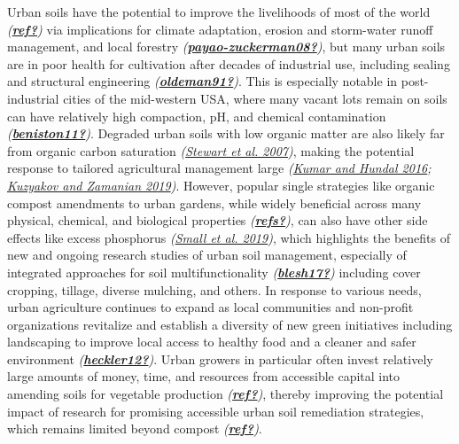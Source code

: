\documentclass[
]{article}
\begin{document}
Urban soils have the potential to improve the livelihoods of most of the world \emph{(\protect\hyperlink{ref-ref}{\textbf{ref?}})} via implications for climate adaptation, erosion and storm-water runoff management, and local forestry \emph{(\protect\hyperlink{ref-payao-zuckerman08}{\textbf{payao-zuckerman08?}})}, but many urban soils are in poor health for cultivation after decades of industrial use, including sealing and structural engineering \emph{(\protect\hyperlink{ref-oldeman91}{\textbf{oldeman91?}})}.
This is especially notable in post-industrial cities of the mid-western USA, where many vacant lots remain on soils can have relatively high compaction, pH, and chemical contamination \emph{(\protect\hyperlink{ref-beniston11}{\textbf{beniston11?}})}.
Degraded urban soils with low organic matter are also likely far from organic carbon saturation \emph{(\protect\hyperlink{ref-stewart07}{Stewart et al. 2007})}, making the potential response to tailored agricultural management large \emph{(\protect\hyperlink{ref-kumar16}{Kumar and Hundal 2016}; \protect\hyperlink{ref-kuzyakov19}{Kuzyakov and Zamanian 2019})}.
However, popular single strategies like organic compost amendments to urban gardens, while widely beneficial across many physical, chemical, and biological properties \emph{(\protect\hyperlink{ref-refs}{\textbf{refs?}})}, can also have other side effects like excess phosphorus \emph{(\protect\hyperlink{ref-small19}{Small et al. 2019})}, which highlights the benefits of new and ongoing research studies of urban soil management, especially of integrated approaches for soil multifunctionality \emph{(\protect\hyperlink{ref-blesh17}{\textbf{blesh17?}})} including cover cropping, tillage, diverse mulching, and others.
In response to various needs, urban agriculture continues to expand as local communities and non-profit organizations revitalize and establish a diversity of new green initiatives including landscaping to improve local access to healthy food and a cleaner and safer environment \emph{(\protect\hyperlink{ref-heckler12}{\textbf{heckler12?}})}.
Urban growers in particular often invest relatively large amounts of money, time, and resources from accessible capital into amending soils for vegetable production \emph{(\protect\hyperlink{ref-ref}{\textbf{ref?}})},
thereby improving the potential impact of research for promising accessible urban soil remediation strategies, which remains limited beyond compost \emph{(\protect\hyperlink{ref-ref}{\textbf{ref?}})}.
\end{document}
